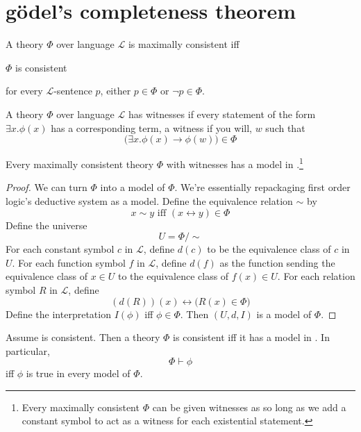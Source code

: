 \message{ !name(truth.tex)}\documentclass{scrbook}
\renewcommand{\implies}{\to}
\renewcommand{\iff}{\leftrightarrow}
\begin{document}
\section[Gödel's completeness theorem]{gödel's completeness theorem}
\begin{defn}
  A theory $\Phi$ over language $\mathcal L$ is maximally consistent iff
  \begin{trivlist}
  \item $\Phi$ is consistent
  \item for every $\mathcal L$-sentence $p$, either $p\in \Phi$ or
    $\neg p \in \Phi$.
  \end{trivlist}
\end{defn}
\begin{defn}[witnesses]
  A theory $\Phi$ over language $\mathcal L$ has witnesses if every statement of the form $\exists x. \phi (x)$ has a corresponding term, a witness if you will, $w$ such that
  \[
  \bigl(\exists x.\phi(x) \implies \phi(w)\bigr) \in  \Phi
  \]
\end{defn}
\begin{theorem}
  Every maximally consistent theory $\Phi$ with witnesses has a model in \zfc.\footnote{Every maximally consistent $\Phi$ can be given witnesses as so long as we add a constant symbol to act as a witness for each existential statement.}
\end{theorem}
\begin{proof}
  We can turn $\Phi$ into a model of $\Phi$. We're essentially repackaging first order logic's deductive system as a model. Define the equivalence relation $\sim$ by 
  \[
  x\sim y \textrm{ iff }(x\iff y) \in \Phi
  \]
  Define the universe
  \[
  U=\Phi/\sim
  \]
  For each constant symbol $c$ in $\mathcal L$, define $d(c)$ to be the equivalence class of $c$ in $U$. 
  For each function symbol $f$ in $\mathcal L$, define $d(f)$ as the function sending the equivalence class of $x\in U$ to the equivalence class of $f(x)\in U$. For each relation symbol $R$ in $\mathcal L$, define
  \[
  (d(R))(x) \iff \bigl(R(x)\in \Phi\bigr)
  \]
  Define the interpretation $I(\phi)$ iff $\phi\in \Phi$. 
  Then $(U,d,I)$ is a model of $\Phi$. 
\end{proof}
\begin{cor}\label{th:completeness}
  Assume \zfc is consistent. Then a theory $\Phi$ is consistent iff it has a model in \zfc. In particular,
  \[
  \Phi \vdash \phi
  \]
  iff $\phi$ is true in every model of $\Phi$.  
\end{cor}
\end{document}
